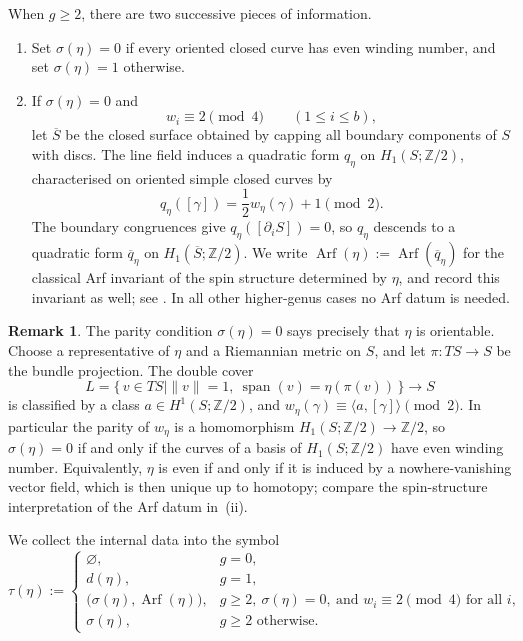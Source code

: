 \documentclass[11pt]{amsart}
\theoremstyle{definition}
\theoremstyle{plain}
\theoremstyle{definition}
\theoremstyle{definition}
\newtheorem{remark}[remark]{Remark}
\newcommand{\ZZ}{\mathbb Z}
\newcommand{\Arf}{\operatorname{Arf}}
\begin{document}
When $g\geq2$, there are two successive pieces of information.
\begin{enumerate}[label=\textup{(\roman*)},leftmargin=2.6em]
\item
Set $\sigma(\eta)=0$ if every oriented closed curve has even winding number,
and set $\sigma(\eta)=1$ otherwise.

\item
If $\sigma(\eta)=0$ and
\[
 w_i\equiv2\pmod4
 \qquad(1\leq i\leq b),
\]
let $\overline S$ be the closed surface obtained by capping all boundary
components of $S$ with discs.  The line field induces a quadratic form
$q_\eta$ on $H_1(S;\mathbb Z/2)$, characterised on oriented simple closed
curves by
\[
 q_\eta([\gamma])=\frac12 w_\eta(\gamma)+1\pmod2.
\]
The boundary congruences give $q_\eta([\partial_iS])=0$, so $q_\eta$
descends to a quadratic form $\overline q_\eta$ on
$H_1(\overline S;\mathbb Z/2)$. We write
$\Arf(\eta):=\Arf(\overline q_\eta)$ for the classical Arf invariant
of the spin structure determined by $\eta$, and record this invariant as well;
see \cite[Lemma~7.5]{AmiotPlamondonSchroll}.  In all other higher-genus
cases no Arf datum is needed. 
\end{enumerate}

\begin{remark}
\label{rem:even-line-field}
The parity condition $\sigma(\eta)=0$ says precisely that $\eta$ is
orientable. Choose a representative of $\eta$ and a Riemannian metric
on $S$, and let $\pi:TS\to S$ be the bundle projection. The double cover
$$
 L=\{\,v\in TS\mid \|v\|=1,\ \operatorname{span}(v)=\eta(\pi(v))\,\}
   \longrightarrow S
$$
is classified by a class $a\in H^1(S;\ZZ/2)$, and
$w_\eta(\gamma)\equiv\langle a,[\gamma]\rangle\pmod2$.  In particular the
parity of $w_\eta$ is a homomorphism $H_1(S;\ZZ/2)\to\ZZ/2$, so
$\sigma(\eta)=0$ if and only if the curves of a basis of $H_1(S;\ZZ/2)$
have even winding number.  Equivalently, $\eta$ is even if and only if
it is induced by a nowhere-vanishing vector field, which is then unique
up to homotopy; compare the spin-structure interpretation of the Arf
datum in~\textup{(ii)}.
\end{remark}

We collect the internal data into the symbol
\begin{equation}
\label{eq:tau-line-field}
 \tau(\eta):=
 \begin{cases}
  \varnothing,
     & g=0,\\
  d(\eta),
     & g=1,\\
  \bigl(\sigma(\eta),\Arf(\eta)\bigr),
     & g\geq2,\ \sigma(\eta)=0,\ \text{and }
       w_i\equiv2\pmod4\text{ for all }i,\\
  \sigma(\eta),
     & g\geq2\text{ otherwise}.
 \end{cases}
\end{equation}
\end{document}
